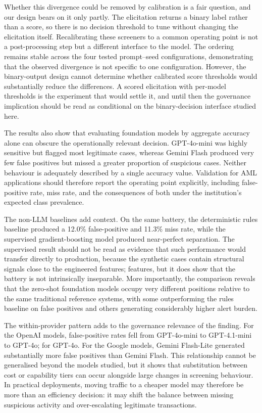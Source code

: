 \documentclass[pdflatex,sn-basic,Numbered]{sn-jnl}
\newcommand{\HLtext}[1]{\texthl{#1}}
\newcommand{\HLdel}[1]{\textcolor{HLink}{\sout{#1}}}
\renewcommand{\HLtext}[1]{#1}\renewcommand{\HLdel}[1]{#1}%
\begin{document}
\HLtext{Whether this divergence could be removed by calibration is a fair question, and our design bears on it only partly. The elicitation returns a binary label rather than a score, so there is no decision threshold to tune without changing the elicitation itself. Recalibrating these screeners to a common operating point is not a post-processing step but a different interface to the model. The ordering remains stable across the four tested prompt--seed configurations, demonstrating that the observed divergence is not specific to one configuration. However, the binary-output design cannot determine whether calibrated score thresholds would substantially reduce the differences. A scored elicitation with per-model thresholds is the experiment that would settle it, and until then the governance implication should be read as conditional on the binary-decision interface studied here.}

The results also show that evaluating foundation models by aggregate accuracy alone can obscure the operationally relevant decision. GPT-4o-mini was highly sensitive but flagged most legitimate cases, whereas Gemini Flash produced very few false positives but missed a greater proportion of suspicious cases. Neither behaviour is adequately described by a single accuracy value. Validation for AML applications should therefore report the operating point explicitly, including false-positive rate, miss rate, and the consequences of both under the institution's expected class prevalence.

The non-LLM baselines add context. On the same battery, the deterministic rules baseline produced a 12.0\% false-positive and 11.3\% miss rate, while the supervised gradient-boosting model produced near-perfect separation. The supervised result should not be read as evidence that such performance would transfer directly to production, because the synthetic cases contain structural signals close to the engineered \HLdel{features;} \HLtext{features,} but it does show that the battery is not intrinsically inseparable. More importantly, the comparison reveals that the zero-shot foundation models occupy very different positions relative to the same traditional reference systems, with some outperforming the rules baseline on false positives and others generating considerably higher alert burden.

The within-provider pattern adds to the governance relevance of the finding. For the OpenAI models, false-positive rates fell from GPT-4o-mini to GPT-4.1-mini to \HLdel{GPT-4o; for} \HLtext{GPT-4o. For} the Google models, Gemini Flash-Lite generated substantially more false positives than Gemini Flash. This relationship cannot be generalised beyond the models studied, but it shows that substitution between cost or capability tiers can occur alongside large changes in screening behaviour. In practical deployments, moving traffic to a cheaper model may therefore be more than an efficiency decision: it may shift the balance between missing suspicious activity and over-escalating legitimate transactions.
\end{document}
